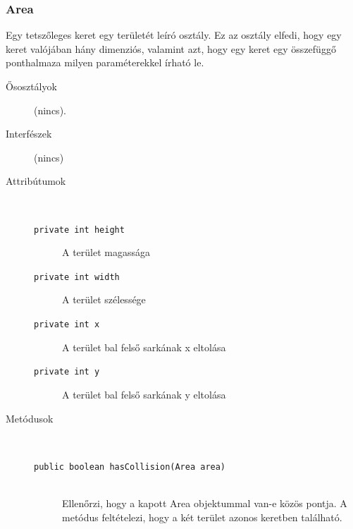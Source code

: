 		\subsubsection{Area}
				 Egy tetszőleges keret egy területét leíró osztály.  Ez az osztály elfedi, hogy egy keret valójában hány dimenziós,  valamint azt, hogy egy keret egy összefüggő ponthalmaza milyen   paraméterekkel írható le. 			\begin{description}


				\item[Ősosztályok] (nincs).
				\item[Interfészek] (nincs)
				\item[Attribútumok]$\ $
					\begin{description}
						\item[\texttt{private int height}] A terület magassága 
						\item[\texttt{private int width}] A terület szélessége 
						\item[\texttt{private int x}] A terület bal felső sarkának x eltolása 
						\item[\texttt{private int y}] A terület bal felső sarkának y eltolása 
					\end{description}
				\item[Metódusok]$\ $
					\begin{description}
						\item[\texttt{public boolean hasCollision(Area area)}] \hfill \\ Ellenőrzi, hogy a kapott Area objektummal van-e közös pontja.  A metódus feltételezi, hogy a két terület azonos keretben található. 
					\end{description}
			\end{description}

